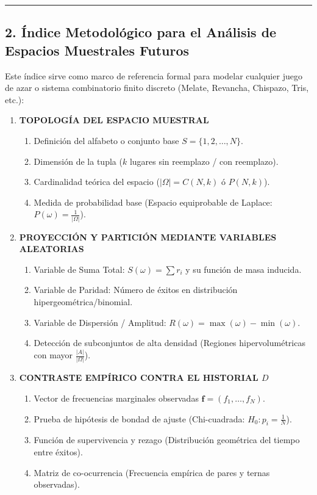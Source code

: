 \documentclass[11pt,a4paper]{article}
\begin{document}
\medskip
\hrule
\medskip

\subsection*{2. Índice Metodológico para el Análisis de Espacios Muestrales Futuros}

Este índice sirve como marco de referencia formal para modelar cualquier juego de azar o sistema combinatorio finito discreto (Melate, Revancha, Chispazo, Tris, etc.):

\begin{enumerate}[label=\textbf{\arabic*.}]
    \item \textbf{TOPOLOGÍA DEL ESPACIO MUESTRAL}
    \begin{enumerate}[label=\textbf{1.\arabic*}]
        \item Definición del alfabeto o conjunto base $S = \{1, 2, \dots, N\}$.
        \item Dimensión de la tupla ($k$ lugares sin reemplazo / con reemplazo).
        \item Cardinalidad teórica del espacio ($|\Omega| = C(N, k)$ ó $P(N, k)$).
        \item Medida de probabilidad base (Espacio equiprobable de Laplace: $P(\omega) = \frac{1}{|\Omega|}$).
    \end{enumerate}

    \item \textbf{PROYECCIÓN Y PARTICIÓN MEDIANTE VARIABLES ALEATORIAS}
    \begin{enumerate}[label=\textbf{2.\arabic*}]
        \item Variable de Suma Total: $S(\omega) = \sum r_i$ y su función de masa inducida.
        \item Variable de Paridad: Número de éxitos en distribución hipergeométrica/binomial.
        \item Variable de Dispersión / Amplitud: $R(\omega) = \max(\omega) - \min(\omega)$.
        \item Detección de subconjuntos de alta densidad (Regiones hipervolumétricas con mayor $\frac{|A|}{|\Omega|}$).
    \end{enumerate}

    \item \textbf{CONTRASTE EMPÍRICO CONTRA EL HISTORIAL $D$}
    \begin{enumerate}[label=\textbf{3.\arabic*}]
        \item Vector de frecuencias marginales observadas $\mathbf{f} = (f_1, \dots, f_N)$.
        \item Prueba de hipótesis de bondad de ajuste (Chi-cuadrada: $H_0: p_i = \frac{1}{N}$).
        \item Función de supervivencia y rezago (Distribución geométrica del tiempo entre éxitos).
        \item Matriz de co-ocurrencia (Frecuencia empírica de pares y ternas observadas).
    \end{enumerate}


\end{enumerate}
\end{document}
